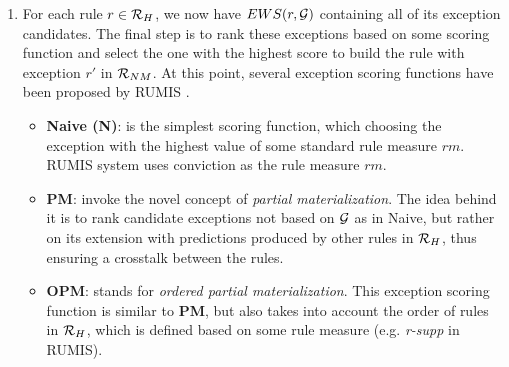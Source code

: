 \begin{enumerate}
\item For each rule $r \in \mathcal{R}_H$, we now have $EWS(r,\mathcal{G})$ containing all of its exception candidates. The final step is to rank these exceptions based on some scoring function and select the one with the highest score to build the rule with exception $r'$ in $\mathcal{R}_{NM}$. At this point, several exception scoring functions have been proposed by RUMIS \cite{rumis}.
\begin{itemize}
\item \textbf{Naive (N)}: is the simplest scoring function, which choosing the exception with the highest value of some standard rule measure $rm$. RUMIS system uses conviction as the rule measure $rm$.
\item \textbf{PM}: invoke the novel concept of \textit{partial materialization}. The idea behind it is to rank candidate exceptions not based on $\mathcal{G}$ as in Naive, but rather on its
extension with predictions produced by other rules in $\mathcal{R}_H$, thus ensuring a crosstalk between the rules.
\item \textbf{OPM}: stands for \textit{ordered partial materialization}. This exception scoring function is similar to \textbf{PM}, but also takes into account the order of rules in $\mathcal{R}_{H}$, which is defined based on some rule measure (e.g. \textit{r-supp} in RUMIS).

\end{itemize}
\end{enumerate}






